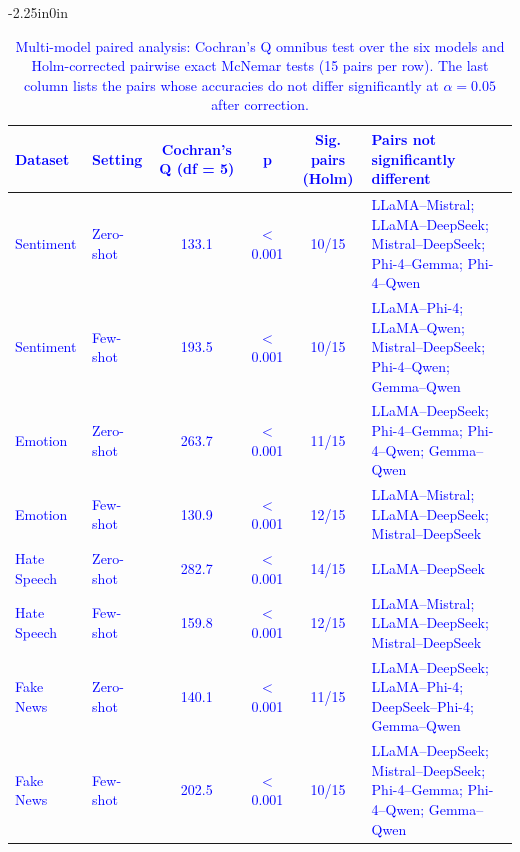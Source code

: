 \documentclass[10pt,letterpaper]{article}
\newcommand{\rev}[1]{\textcolor{blue}{#1}}
\begin{document}
\begin{table}[!t]
\begin{adjustwidth}{-2.25in}{0in}
\centering
\small
\caption{\rev{Multi-model paired analysis: Cochran's Q omnibus test over the six models and Holm-corrected pairwise exact McNemar tests (15 pairs per row). The last column lists the pairs whose accuracies do not differ significantly at $\alpha = 0.05$ after correction.}}
\label{tab:cochran}
\renewcommand{\arraystretch}{1.1}
\setlength{\tabcolsep}{5pt}
\begin{tabular}{|l|l|c|c|c|p{7.2cm}|}
\hline
\rev{\textbf{Dataset}} & \rev{\textbf{Setting}} & \rev{\textbf{Cochran's Q (df = 5)}} & \rev{\textbf{p}} & \rev{\textbf{Sig. pairs (Holm)}} & \rev{\textbf{Pairs not significantly different}} \\ 
\hline
\rev{Sentiment} & \rev{Zero-shot} & \rev{133.1} & \rev{$<$0.001} & \rev{10/15} & \rev{LLaMA--Mistral; LLaMA--DeepSeek; Mistral--DeepSeek; Phi-4--Gemma; Phi-4--Qwen} \\ 
\rev{Sentiment} & \rev{Few-shot} & \rev{193.5} & \rev{$<$0.001} & \rev{10/15} & \rev{LLaMA--Phi-4; LLaMA--Qwen; Mistral--DeepSeek; Phi-4--Qwen; Gemma--Qwen} \\ 
\hline
\rev{Emotion} & \rev{Zero-shot} & \rev{263.7} & \rev{$<$0.001} & \rev{11/15} & \rev{LLaMA--DeepSeek; Phi-4--Gemma; Phi-4--Qwen; Gemma--Qwen} \\ 
\rev{Emotion} & \rev{Few-shot} & \rev{130.9} & \rev{$<$0.001} & \rev{12/15} & \rev{LLaMA--Mistral; LLaMA--DeepSeek; Mistral--DeepSeek} \\ 
\hline
\rev{Hate Speech} & \rev{Zero-shot} & \rev{282.7} & \rev{$<$0.001} & \rev{14/15} & \rev{LLaMA--DeepSeek} \\ 
\rev{Hate Speech} & \rev{Few-shot} & \rev{159.8} & \rev{$<$0.001} & \rev{12/15} & \rev{LLaMA--Mistral; LLaMA--DeepSeek; Mistral--DeepSeek} \\ 
\hline
\rev{Fake News} & \rev{Zero-shot} & \rev{140.1} & \rev{$<$0.001} & \rev{11/15} & \rev{LLaMA--DeepSeek; LLaMA--Phi-4; DeepSeek--Phi-4; Gemma--Qwen} \\ 
\rev{Fake News} & \rev{Few-shot} & \rev{202.5} & \rev{$<$0.001} & \rev{10/15} & \rev{LLaMA--DeepSeek; Mistral--DeepSeek; Phi-4--Gemma; Phi-4--Qwen; Gemma--Qwen} \\ 
\hline
\end{tabular}
\end{adjustwidth}
\end{table}
\end{document}
